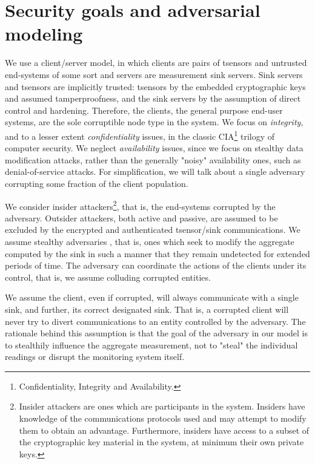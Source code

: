 \section*{Security goals and adversarial modeling}
\label{sec:sec-goals}

We use a client/server model, in which clients are pairs of tsensors and untrusted end-systems of some sort and servers are measurement sink servers. Sink servers and tsensors are implicitly trusted: tsensors by the embedded cryptographic keys and assumed tamperproofness, and the sink servers by the assumption of direct control and hardening. Therefore, the clients, the general purpose end-user systems, are the sole corruptible node type in the system.
%
We focus on \textit{integrity}, and to a lesser extent \textit{confidentiality} issues, in the classic CIA\footnote{Confidentiality, Integrity and Availability.} trilogy of computer security. We neglect \textit{availability} issues, since we focus on stealthy data modification attacks, rather than the generally "noisy" availability ones, such as denial-of-service attacks. For simplification, we will talk about a single adversary corrupting some fraction of the client population.

We consider insider attackers\footnote{Insider attackers are ones which are participants in the system. Insiders have knowledge of the communications protocols used and may attempt to modify them to obtain an advantage. Furthermore, insiders have access to a subset of the cryptographic key material in the system, at minimum their own private keys.}, that is, the end-systems corrupted by the adversary. Outsider attackers, both active and passive, are assumed to be excluded by the encrypted and authenticated tsensor/sink communications. We assume stealthy adversaries , that is, ones which seek to modify the aggregate computed by the sink in such a manner that they remain undetected for extended periods of time. The adversary can coordinate the actions of the clients under its control, that is, we assume colluding corrupted entities.

We assume the client, even if corrupted, will always communicate with a single sink, and further, its correct designated sink. That is, a corrupted client will never try to divert communications to an entity controlled by the adversary. The rationale behind this assumption is that the goal of the adversary in our model is to stealthily influence the aggregate measurement, not to "steal" the individual readings or disrupt the monitoring system itself.

